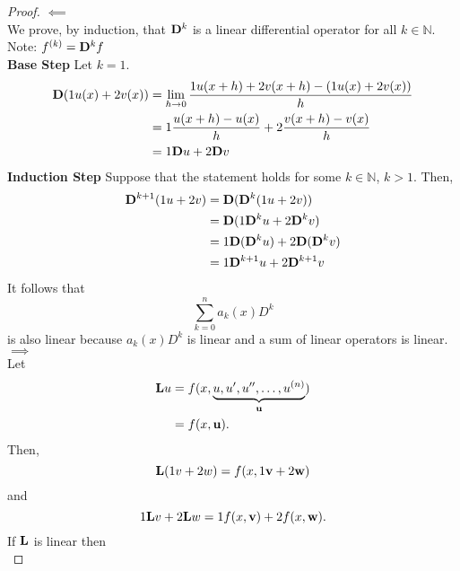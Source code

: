 \begin{proof}\(\impliedby\)\\
	We prove, by induction, that \(\mathrm{\bf{D}}^{k}\) is a linear differential operator for all \(k \in \mathbb{N}\). Note: \(f^{(k)}=\mathrm{\bf{D}}^{k}f\)\\
	\textbf{Base Step} Let \(k=1\).\\
	\begin{equation*}
		\begin{split}
			\mathrm{\bf{D}} (1 u(x) + 2 v(x)) &= \lim_{h\to 0} \frac{1 u(x+h) + 2 v(x+h)-(1 u(x) + 2 v(x))}{h}\\
			&=1 \frac{u(x+h) - u(x)}{h} + 2 \frac{v(x+h)-v(x)}{h}\\
			&= 1 \mathrm{\bf{D}} u + 2 \mathrm{\bf{D}} v
		\end{split}
	\end{equation*}
	\textbf{Induction Step} Suppose that the statement holds for some \(k\in\mathbb{N}\), \(k>1\). Then,
	\begin{equation*}
		\begin{split}
			\mathrm{\bf{D}}^{k+1} (1 u + 2 v) &= \mathrm{\bf{D}} ( \mathrm{\bf{D}}^{k}(1 u + 2 v))\\
			&=\mathrm{\bf{D}}(1 \mathrm{\bf{D}}^{k} u + 2 \mathrm{\bf{D}}^{k} v)\\
			&=1 \mathrm{\bf{D}}(\mathrm{\bf{D}}^{k} u) + 2 \mathrm{\bf{D}} (\mathrm{\bf{D}}^{k} v)\\
			&= 1 \mathrm{\bf{D}}^{k+1} u + 2 \mathrm{\bf{D}}^{k+1} v
		\end{split}
	\end{equation*}
	It follows that 
	\begin{equation*}
		\sum_{k=0}^{n} a_k(x) D^{k}
	\end{equation*}
	is also linear because \(a_k(x) D^{k}\) is linear and a sum of linear operators is linear.\\
	\(\implies\)\\
	Let
	\begin{equation*}
		\begin{split}
			\mathrm{\bf{L}} u &= f(x, \underbrace{u, u', u'', \dots, u^{(n)}}_{\textbf{u}})\\
			&=f(x, \textbf{u}).
		\end{split}
	\end{equation*}
	Then,
	\begin{equation*}
		\mathrm{\bf{L}} (1 v + 2 w) = f(x, 1 \textbf{v} + 2 \textbf{w})
	\end{equation*}
	and
	\begin{equation*}
		1 \mathrm{\bf{L}} v + 2 \mathrm{\bf{L}} w = 1 f(x,\textbf{v}) + 2 f(x,\textbf{w}).
	\end{equation*}
	If \(\mathrm{\bf{L}}\) is linear then 
	\begin{equation*}

\end{equation*}
\end{proof}
